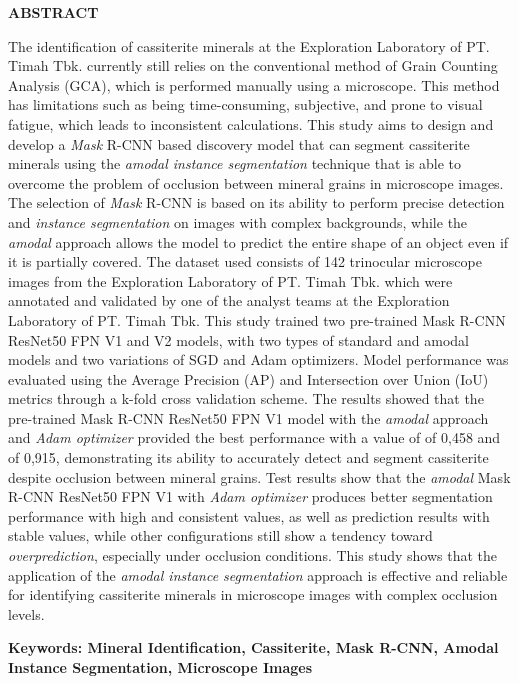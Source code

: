 \clearpage
{}%
\thispagestyle{fancy}

\begin{center}
	\large \bfseries \MakeUppercase{Abstract}\\
	\bigskip
	
	\normalsize \normalfont \justifying \singlespacing
	The identification of cassiterite minerals at the Exploration Laboratory of PT. Timah Tbk. currently still relies on the conventional method of Grain Counting Analysis (GCA), which is performed manually using a microscope. This method has limitations such as being time-consuming, subjective, and prone to visual fatigue, which leads to inconsistent calculations. This study aims to design and develop a \textit{Mask} R-CNN based discovery model that can segment cassiterite minerals using the \textit{amodal instance segmentation} technique that is able to overcome the problem of occlusion between mineral grains in microscope images. The selection of \textit{Mask} R-CNN is based on its ability to perform precise detection and \textit{instance segmentation} on images with complex backgrounds, while the \textit{amodal} approach allows the model to predict the entire shape of an object even if it is partially covered. The dataset used consists of 142 trinocular microscope images from the Exploration Laboratory of PT. Timah Tbk. which were annotated and validated by one of the analyst teams at the Exploration Laboratory of PT. Timah Tbk. This study trained two pre-trained Mask R-CNN ResNet50 FPN V1 and V2 models, with two types of standard and amodal models and two variations of SGD and Adam optimizers. Model performance was evaluated using the Average Precision (AP) and Intersection over Union (IoU) metrics through a k-fold cross validation scheme. The results showed that the pre-trained Mask R-CNN ResNet50 FPN V1 model with the \textit{amodal} approach and \textit{Adam optimizer} provided the best performance with a value of \APrangefiftyy of 0{,}458 and \IoUrangefiftyy of 0{,}915, demonstrating its ability to accurately detect and segment cassiterite despite occlusion between mineral grains. Test results show that the \textit {amodal} Mask R-CNN ResNet50 FPN V1 with \textit{Adam optimizer} produces better segmentation performance with high and consistent \IoUrangefiftyy values, as well as prediction results with stable \APrangefiftyy values, while other configurations still show a tendency toward \textit{overprediction}, especially under occlusion conditions. This study shows that the application of the \textit{amodal instance segmentation} approach is effective and reliable for identifying cassiterite minerals in microscope images with complex occlusion levels. \par


    \vspace{20pt}
	\raggedright\textbf{Keywords: Mineral Identification, Cassiterite, Mask R-CNN, Amodal Instance Segmentation, Microscope Images}
	
	\vfill
	
\end{center}
\clearpage